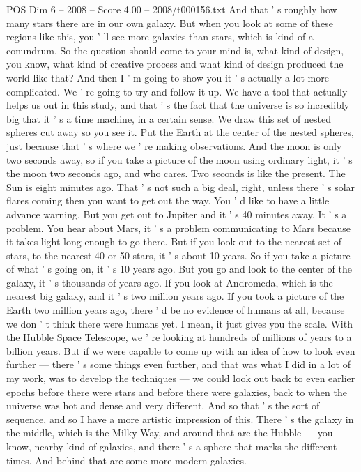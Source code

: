 \begin{textsample}{POS Dim 6 – 2008 – Score 4.00 – 2008/t000156.txt}
And that ' s roughly how many stars there are in our own galaxy.
But when you look at some of these regions like this, you ' ll see more galaxies than stars, which is kind of a conundrum.
So the question should come to your mind is, what kind of design, you know, what kind of creative process and what kind of design produced the world like that?
And then I ' m going to show you it ' s actually a lot more complicated.
We ' re going to try and follow it up.
We have a tool that actually helps us out in this study, and that ' s the fact that the universe is so incredibly big that it ' s a time machine, in a certain sense.
We draw this set of nested spheres cut away so you see it.
Put the Earth at the center of the nested spheres, just because that ' s where we ' re making observations.
And the moon is only two seconds away, so if you take a picture of the moon using ordinary light, it ' s the moon two seconds ago, and who cares.
Two seconds is like the present.
The Sun is eight minutes ago.
That ' s not such a big deal, right, unless there ' s solar flares coming then you want to get out the way.
You ' d like to have a little advance warning.
But you get out to Jupiter and it ' s 40 minutes away.
It ' s a problem.
You hear about Mars, it ' s a problem communicating to Mars because it takes light long enough to go there.
But if you look out to the nearest set of stars, to the nearest 40 or 50 stars, it ' s about 10 years.
So if you take a picture of what ' s going on, it ' s 10 years ago.
But you go and look to the center of the galaxy, it ' s thousands of years ago.
If you look at Andromeda, which is the nearest big galaxy, and it ' s two million years ago.
If you took a picture of the Earth two million years ago, there ' d be no evidence of humans at all, because we don ' t think there were humans yet.
I mean, it just gives you the scale.
With the Hubble Space Telescope, we ' re looking at hundreds of millions of years to a billion years.
But if we were capable to come up with an idea of how to look even further — there ' s some things even further, and that was what I did in a lot of my work, was to develop the techniques — we could look out back to even earlier epochs before there were stars and before there were galaxies, back to when the universe was hot and dense and very different.
And so that ' s the sort of sequence, and so I have a more artistic impression of this.
There ' s the galaxy in the middle, which is the Milky Way, and around that are the Hubble — you know, nearby kind of galaxies, and there ' s a sphere that marks the different times.
And behind that are some more modern galaxies.

\end{textsample}
